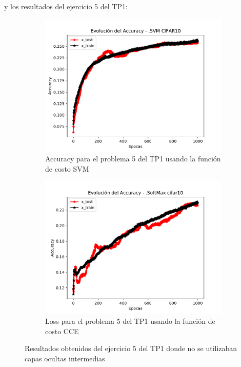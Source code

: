 y los resultados del ejercicio 5 del TP1:
\begin{figure}[H]
     \centering
     \begin{subfigure}[b]{0.45\textwidth}
         \centering
         \includegraphics[width=\textwidth]{image/AccuracySVM CIFAR10.pdf}
         \caption{Accuracy para el problema 5 del TP1 usando la función de costo SVM}
         \label{fig:acc6a}
     \end{subfigure}
     \hfill
     \begin{subfigure}[b]{0.45\textwidth}
         \centering
         \includegraphics[width=\textwidth]{image/AccuracySoftMax cifar10.pdf}
         \caption{Loss para el problema 5 del TP1 usando la función de costo CCE}
         \label{fig:loss6a}
     \end{subfigure}
        \caption{Resultados obtenidos del ejercicio 5 del TP1 donde no se utilizaban capas ocultas intermedias}
        \label{fig:ej5_TP1}
\end{figure}

